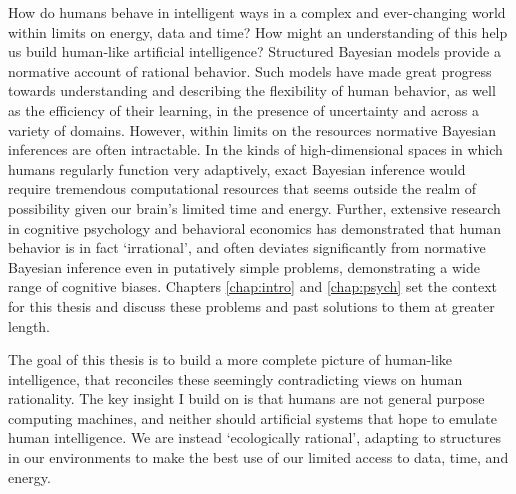 

How do humans behave in intelligent ways in a complex and ever-changing world within limits on energy, data and time? How might an understanding of this help us build human-like artificial intelligence? Structured Bayesian models provide a normative account of rational behavior. Such models have made great progress towards understanding and describing the flexibility of human behavior, as well as the efficiency of their learning, in the presence of uncertainty and across a variety of domains. However, within limits on the resources normative Bayesian inferences are often intractable. In the kinds of high-dimensional spaces in which humans regularly function very adaptively, exact Bayesian inference would require tremendous computational resources that seems outside the realm of possibility given our brain's limited time and energy.
Further, extensive research in cognitive psychology and behavioral economics has demonstrated that human behavior is in fact `irrational', and often deviates significantly from normative Bayesian inference even in putatively simple problems, demonstrating a wide range of cognitive biases. Chapters \ref{chap:intro} and \ref{chap:psych} set the context for this thesis and discuss these problems and past solutions to them at greater length. 

The goal of this thesis is to build a more complete picture of human-like intelligence, that reconciles these seemingly contradicting views on human rationality. The key insight I build on is that humans are not general purpose computing machines, and neither should artificial systems that hope to emulate human intelligence. We are instead `ecologically rational', adapting to structures in our environments to make the best use of our limited access to data, time, and energy. 



